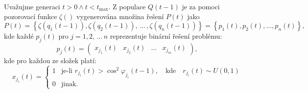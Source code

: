 Uvažujme generaci $t>0 \wedge t<t_{\text{max}}$. Z populace $Q\left(t-1\right)$ je za pomoci pozorovací funkce $\zeta\left(\right)$ vygenerována množina řešení $P\left(t\right)$ jako
\begin{equation}
    P\left(t\right) = \left\{\zeta\left(q_1\left(t-1\right)\right), \zeta\left(q_2\left(t-1\right)\right), \,\dots\, , \zeta\left(q_n\left(t-1\right)\right) \right\} = \left\{ p_1\left(t\right), p_2\left(t\right), \dots, p_n\left(t\right) \right\},
\end{equation}
kde každé $p_j\left(t\right)$ pro $j=1,2,\,\dots\,n$ reprezentuje binární řešení problému:
\begin{equation*}
    p_j\left(t\right) = 
    \begin{pmatrix}
        x_{j_1}\left(t\right) & x_{j_2}\left(t\right) & \dots & x_{j_m}\left(t\right)
    \end{pmatrix},
\end{equation*}
kde pro každou ze složek platí:
\begin{equation*}
    x_{j_i}\left(t\right) =
    \begin{cases}
      1 & \text{je-li } r_{j_i}\left(t\right) >\cos^2 \varphi_{j_i}\left(t-1\right),\quad\text{kde}\quad r_{j_i}\left(t\right) \sim U\left(0,1\right)\\
      0 & \text{jinak.}
    \end{cases}
\end{equation*}

